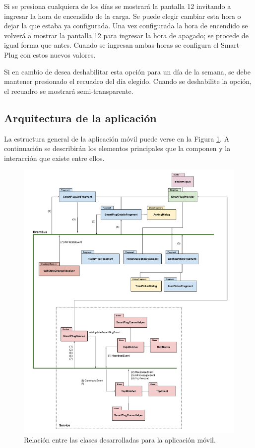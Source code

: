\begin{itemize}
Si se presiona cualquiera de los días se mostrará la pantalla 12 invitando a ingresar la hora de encendido de la carga. Se puede elegir cambiar esta hora o dejar la que estaba ya configurada. Una vez configurada la hora de encendido se volverá a mostrar la pantalla 12 para ingresar la hora de apagado; se procede de igual forma que antes. Cuando se ingresan ambas horas se configura el Smart Plug con estos nuevos valores.

Si en cambio de desea deshabilitar esta opción para un día de la semana, se debe mantener presionado el recuadro del día elegido. Cuando se deshabilite la opción, el recuadro se mostrará semi-transparente.

\end{itemize}


\subsection{Arquitectura de la aplicación}
\label{subsec:arquitectura_app}

La estructura general de la aplicación móvil puede verse en la Figura \ref{fig:app_arquitectura}. A continuación se describirán los elementos principales que la componen y la interacción que existe entre ellos.

\begin{figure}[h]
	\centering
	\includegraphics[width=14cm]{./Figures/3_3_2_app-arquitectura.pdf}
	\caption{Relación entre las clases desarrolladas para la aplicación móvil.}
	\label{fig:app_arquitectura}
\end{figure}

